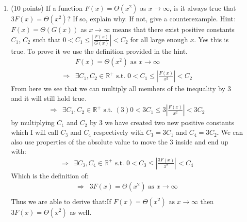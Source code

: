 \documentclass{article}
\begin{document}
\begin{enumerate}
    \newpage
    \item (10 points) If a function $F(x) = \Theta(x^2)$ as $x \to \infty$, is it always true that $3F(x) = \Theta(x^2)$? If so, explain why. If not, give a counterexample.
    \newline
    Hint: $F(x) = \Theta(G(x))$ as $x \to \infty$ means that there exist positive constants $C_1$, $C_2$ such that $0 < C_1 \leq \left|\frac{F(x)}{G(x)}\right| < C_2$ for all large enough $x$.
    \newline
    \newline
    Yes this is true. To prove it we use the definition provided in the hint. 
    \begin{align*}
        &F(x) = \Theta(x^2) \mbox{ as } x \to \infty\\
        \Rightarrow&\exists C_1, C_2 \in \mathbb{R}^+\mbox{ s.t. } 0 < C_1 \leq \left|\frac{F(x)}{x^2}\right| < C_2
    \end{align*}
    From here we see that we can multiply all members of the inequality by 3 and it will still hold true.
    \begin{align*}
        \Rightarrow&\exists C_1, C_2 \in \mathbb{R}^+\mbox{ s.t. } (3)0 < 3C_1 \leq 3\left|\frac{F(x)}{x^2}\right| < 3C_2
    \end{align*}
    by multiplying $C_1$ and $C_2$ by 3 we have created two new positive constants which I will call $C_3$ and $C_4$ respectively with $C_3 = 3C_1$ and $C_4 = 3C_2$. We can also use properties of the absolute value to move the 3 inside and end up with:
    \begin{align*}
        \Rightarrow&\exists C_3, C_4 \in \mathbb{R}^+\mbox{ s.t. } 0 < C_3 \leq \left|\frac{3F(x)}{x^2}\right| < C_4
    \end{align*}
    Which is the definition of:
    \begin{align*}
        \Rightarrow&3F(x) = \Theta(x^2) \mbox{ as } x \to \infty\\
    \end{align*}
    Thus we are able to derive that:\newline If $F(x) = \Theta(x^2) \mbox{ as } x \to \infty$ then $3F(x) = \Theta(x^2)$ as well. 
    

\end{enumerate}
\end{document}
